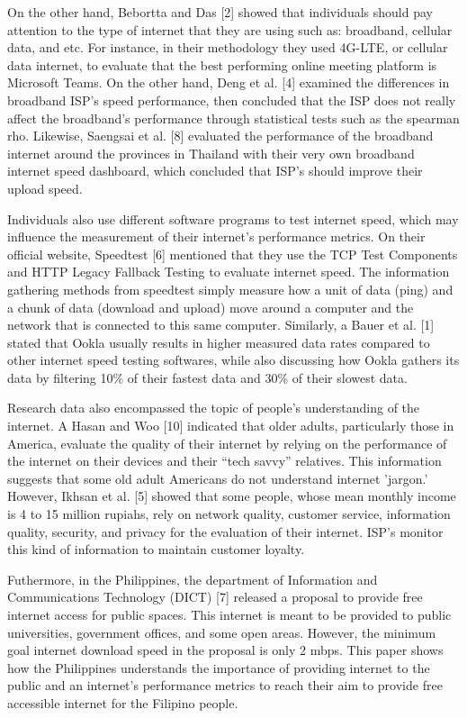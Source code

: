 \documentclass[conference]{IEEEtran}
\begin{document}
On the other hand, Bebortta and Das [2] showed that individuals should pay attention to the type of internet that they are using such as: broadband, cellular data, and etc. For instance, in their methodology they used 4G-LTE, or cellular data internet, to evaluate that the best performing online meeting platform is Microsoft Teams. On the other hand, Deng et al. [4] examined the differences in broadband ISP's speed performance, then concluded that the ISP does not really affect the broadband's performance through statistical tests such as the spearman rho. Likewise, Saengsai et al. [8] evaluated the performance of the broadband internet around the provinces in Thailand with their very own broadband internet speed dashboard, which concluded that ISP's should improve their upload speed.

Individuals also use different software programs to test internet speed, which may influence the measurement of their internet's performance metrics. On their official website, Speedtest [6] mentioned that they use the TCP Test Components and HTTP Legacy Fallback Testing to evaluate internet speed. The information gathering methods from speedtest simply measure how a unit of data (ping) and a chunk of data (download and upload) move around a computer and the network that is connected to this same computer. Similarly, a Bauer et al. [1] stated that Ookla usually results in higher measured data rates compared to other internet speed testing softwares, while also discussing how Ookla gathers its data by filtering 10\% of their fastest data and 30\% of their slowest data.

Research data also encompassed the topic of people's understanding of the internet. A Hasan and Woo [10] indicated that older adults, particularly those in America, evaluate the quality of their internet by relying on the performance of the internet on their devices and their “tech savvy” relatives. This information suggests that some old adult Americans do not understand internet 'jargon.' However, Ikhsan et al. [5] showed that some people, whose mean monthly income is 4 to 15 million rupiahs, rely on network quality, customer service, information quality, security, and privacy for the evaluation of their internet. ISP's monitor this kind of information to maintain customer loyalty.

Futhermore, in the Philippines, the department of Information and Communications Technology (DICT) [7] released a proposal to provide free internet access for public spaces. This internet is meant to be provided to public universities, government offices, and some open areas. However, the minimum goal internet download speed in the proposal is only 2 mbps. This paper shows how the Philippines understands the importance of providing internet to the public and an internet's performance metrics to reach their aim to provide free accessible internet for the Filipino people.
\end{document}

